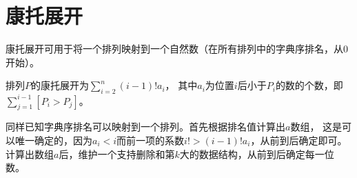 \section{康托展开}
康托展开可用于将一个排列映射到一个自然数（在所有排列中的字典序排名，从0开始）。

排列$P$的康托展开为$\displaystyle \sum_{i=2}^n{(i-1)!a_i}$，
其中$a_i$为位置$i$后小于$P_i$的数的个数，即$\sum_{j=1}^{i-1}[P_i>P_j]$。

同样已知字典序排名可以映射到一个排列。首先根据排名值计算出$a$数组，
这是可以唯一确定的，因为$a_i<i$而前一项的系数$i!> (i-1)!a_i$，从前到后确定即可。
计算出数组$a$后，维护一个支持删除和第$k$大的数据结构，从前到后确定每一位数。
